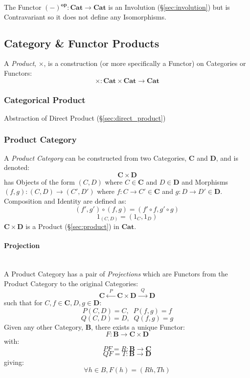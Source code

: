 The Functor $(-)^\mathbf{op} : \mathbf{Cat} \rightarrow \mathbf{Cat}$
is an Involution (\S\ref{sec:involution}) but is Contravariant so it
does not define any Isomorphisms.



\subsection{Category \& Functor Products}\label{sec:category_product}

A \emph{Product}, $\times$, is a construction (or more specifically a
Functor) on Categories or Functors:
\[
  \times : \mathbf{Cat} \times \mathbf{Cat} \rightarrow \mathbf{Cat}
\]



\subsubsection{Categorical Product}\label{sec:categorical_product}

Abstraction of Direct Product (\S\ref{sec:direct_product})



\subsubsection{Product Category}\label{sec:product_category}

A \emph{Product Category} can be constructed from two Categories,
$\mathbf{C}$ and $\mathbf{D}$, and is denoted:
\[
  \mathbf{C} \times \mathbf{D}
\]
has Objects of the form $(C,D)$ where $C \in \mathbf{C}$ and $D \in
\mathbf{D}$ and Morphisms $(f,g) : (C,D) \rightarrow (C',D')$ where $f
: C \rightarrow C' \in \mathbf{C}$ and $g : D \rightarrow D' \in
\mathbf{D}$. Composition and Identity are defined as:
\[
  (f',g') \circ (f,g) = (f' \circ f,g' \circ g)
\]\[
  1_{(C,D)} = (1_C, 1_D)
\]
$\mathbf{C} \times \mathbf{D}$ is a Product (\S\ref{sec:product}) in
$\mathbf{Cat}$.



\paragraph{Projection}\label{sec:projection_functor}
\hfill \\
A Product Category has a pair of \emph{Projections} which are Functors
from the Product Category to the original Categories:
\[
  \mathbf{C} \xleftarrow{\;\; P\;\;} \mathbf{C}\times\mathbf{D}
  \xrightarrow{\;\; Q\;\;} \mathbf{D}
\]
such that for $C,f \in \mathbf{C}, D,g \in \mathbf{D}$:
\[
  P(C,D) = C, \;\; P(f,g) = f
\]\[
  Q(C,D) = D, \;\; Q(f,g) = g
\]
Given any other Category, $\mathbf{B}$, there exists a unique Functor:
\[
  F : \mathbf{B} \rightarrow \mathbf{C} \times \mathbf{D}
\]
with:
\[
  PF = R : \mathbf{B} \rightarrow \mathbf{C}
\]\[
  QF = T : \mathbf{B} \rightarrow \mathbf{D}
\]
giving:
\[
  \forall h \in B, F(h) = (Rh,Th)
\]



